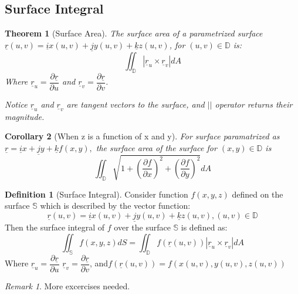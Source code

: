 \documentclass[12pt,a4paper]{article}
\newtheorem{theorem}{Theorem}[subsection]
\newtheorem{corollary}[theorem]{Corollary}
\theoremstyle{definition}
\newtheorem{definition}{Definition}[section]
\theoremstyle{remark}
\newtheorem{remark}{Remark}[section]
\begin{document}
\subsection{Surface Integral}
\begin{theorem}[Surface Area]
The surface area of a parametrized surface $\underline{r}(u,v) = \underline{i}x(u,v) + \underline{j}y(u,v) + \underline{k}z(u,v)$, for $(u,v) \in \mathbb{D}$ is:
\[
	\iint_{\mathbb{D}} | \underline{r}_u \times \underline{r}_v | dA
\]
Where $ \underline{r}_u = \dfrac{\partial \underline{r}}{\partial u}$ 
and $ \underline{r}_v = \dfrac{\partial \underline{r}}{\partial v}$. 

Notice $ \underline{r}_u $ and $ \underline{r}_v $ are tangent vectors to the surface, and $||$ operator returns their magnitude.
\end{theorem}

\begin{corollary}[When z is a function of x and y]
For surface paramatrized as $ \underline{r} = \underline{i}x+ \underline{j}y+ \underline{k} f(x,y),$ the surface area of the surface for $(x,y) \in \mathbb{D}$ is 
\[
	\iint_{ \mathbb{D}} \sqrt{1 + \left( \frac{\partial f}{\partial x} \right)^2 + \left( \frac{\partial f}{\partial y} \right)^2} dA
\]
	
\end{corollary}


\begin{definition}[Surface Integral]
	Consider function $f(x,y,z)$ defined on the surface $ \mathbb{S}$ which is described by the vector function: 
	\[
		\underline{r}(u,v) = \underline{i}x(u,v) + \underline{j}y(u,v) + \underline{k}z(u,v), (u, v) \in \mathbb{D}
	\]
	Then the surface integral of $f$ over the surface $\mathbb{S}$ is defined as:
	\[
		\iint_{\mathbb{S}} f(x,y,z) dS
	=
		\iint_{\mathbb{D}} f( \underline{r}(u,v)) | \underline{r}_u \times \underline{r}_v | dA
	\]
Where $ \underline{r}_u = \dfrac{\partial \underline{r}}{\partial u}$
$ \underline{r}_v = \dfrac{\partial \underline{r}}{\partial v}$,
and$f( \underline{r}(u,v)) = f(x(u,v), y(u,v), z(u,v))$


\end{definition}

\begin{remark}
	More excercises needed.
\end{remark}
\end{document}
